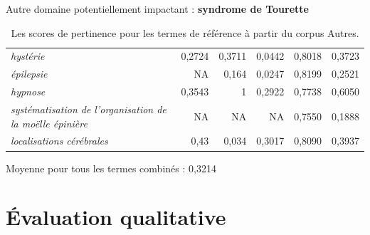 \documentclass[xcolor={table,usenames,dvipsnames}]{beamer}
\begin{document}
\begin{frame}{Autre domaine potentiellement impactant : \textbf{syndrome de Tourette}}
\begin{table}[h]
{\begin{tabular}{|l|r|r|r|r|r|}
		\textit{hystérie} & 0,2724 & 0,3711 & 0,0442 & 0,8018 & 0,3723 \\
		\textit{épilepsie} & NA & 0,164 & 0,0247 & 0,8199 & 0,2521 \\
		\textit{hypnose} & 0,3543 & 1 & 0,2922 & 0,7738 & 0,6050 \\
		\textit{systématisation de l'organisation de la moëlle épinière} & NA & NA & NA & 0,7550 & 0,1888 \\
		\textit{localisations cérébrales} & 0,43 & 0,034 & 0,3017 & 0,8090 & 0,3937 \\
		\hline
		\end{tabular}
	}
		\caption{Les scores de pertinence pour les termes de référence à partir du corpus \og{}Autres\fg{}.}
	\end{table}
	{\small Moyenne pour tous les termes combinés : 0,3214}
\end{frame}





\section[Évaluation qualitative]{Évaluation qualitative}
\end{document}
